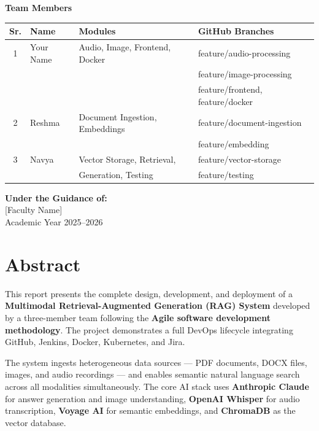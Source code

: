 \documentclass[12pt,a4paper]{report}
\begin{document}
\begin{titlepage}
    {\large\bfseries Team Members}\\[0.5cm]
    \begin{tabular}{clll}
        \toprule
        \textbf{Sr.} & \textbf{Name} & \textbf{Modules} & \textbf{GitHub Branches} \\
        \midrule
        1 & Your Name & Audio, Image, Frontend, Docker & feature/audio-processing \\
          &           &                                & feature/image-processing \\
          &           &                                & feature/frontend, feature/docker \\
        \midrule
        2 & Reshma & Document Ingestion, Embeddings & feature/document-ingestion \\
          &        &                                & feature/embedding \\
        \midrule
        3 & Navya & Vector Storage, Retrieval, & feature/vector-storage \\
          &       & Generation, Testing         & feature/testing \\
        \bottomrule
    \end{tabular}

    \vspace{1cm}

    {\large\bfseries Under the Guidance of:}\\[0.3cm]
    {\large [Faculty Name]}\\[0.2cm]
    {\large Academic Year 2025--2026}

\end{titlepage}

\chapter*{Abstract}
\onehalfspacing

This report presents the complete design, development, and deployment of a \textbf{Multimodal Retrieval-Augmented Generation (RAG) System} developed by a three-member team following the \textbf{Agile software development methodology}. The project demonstrates a full DevOps lifecycle integrating GitHub, Jenkins, Docker, Kubernetes, and Jira.

The system ingests heterogeneous data sources --- PDF documents, DOCX files, images, and audio recordings --- and enables semantic natural language search across all modalities simultaneously. The core AI stack uses \textbf{Anthropic Claude} for answer generation and image understanding, \textbf{OpenAI Whisper} for audio transcription, \textbf{Voyage AI} for semantic embeddings, and \textbf{ChromaDB} as the vector database.
\end{document}
